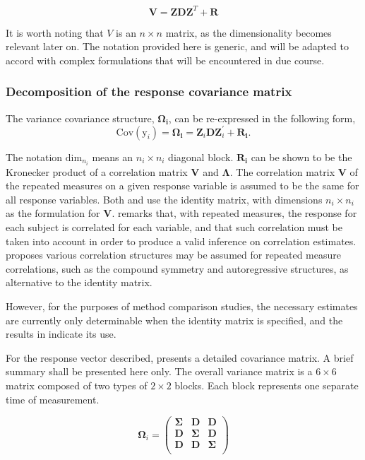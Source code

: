 \documentclass[12pt, a4paper]{report}
\theoremstyle{plain}
\theoremstyle{definition}
\theoremstyle{remark}
\begin{document}
	\begin{equation}
	\textbf{V}  = \textbf{ZDZ}^{T} + \textbf{R}
	\end{equation}
	
	It is worth noting that $V$ is an $n \times n$ matrix, as the dimensionality becomes relevant later on. The notation provided here is generic, and will be adapted to accord with complex formulations that will be encountered in due course.
	
	\subsubsection{Decomposition of the response covariance matrix}
	The variance covariance structure, $\boldsymbol{\Omega_{i}}$, can be re-expressed in the following form,
	\[
	\mbox{Cov}(\mbox{y}_{i}) = \boldsymbol{\Omega_{i}} = \boldsymbol{Z}_{i}\boldsymbol{D}\boldsymbol{Z}_{i}^\prime + \boldsymbol{R_{i}}.
	\]
	
	The notation $\mbox{dim}_{n_{i}}$ means an $n_{i} \times n_{i}$ diagonal block.
	$\boldsymbol{R_{i}}$ can be shown to be the Kronecker product of a correlation matrix $\boldsymbol{V}$ and $\boldsymbol{\Lambda}$. The correlation matrix $\boldsymbol{V}$ of the repeated measures on a given response variable is assumed to be the same for all response variables. Both \citet{hamlett} and \citet{lam} use the identity matrix, with dimensions $n_{i} \times n_{i}$ as the formulation for $\boldsymbol{V}$. \citet{ARoy2009} remarks that, with repeated measures, the response for each subject is correlated for each variable, and that such correlation must be taken into account in order to produce a valid inference on correlation estimates.  \citet{roy2006} proposes various correlation structures may be assumed for repeated measure correlations, such as the compound symmetry and autoregressive structures, as alternative to the identity matrix.
	
	
	However, for the purposes of method comparison studies, the necessary estimates are currently only determinable when the identity matrix is specified, and the results in \citet{ARoy2009} indicate its use.
	
	For the response vector described, \citet{hamlett} presents a detailed covariance matrix. A brief summary shall be presented here only. The overall variance matrix is a $6 \times 6$ matrix composed of two types of $2 \times 2$ blocks. Each block represents one separate time of measurement.
	
	\[
	\boldsymbol{\Omega}_{i} = \left(
	\begin{array}{ccc}
	\boldsymbol{\Sigma} & \boldsymbol{D} & \boldsymbol{D}\\
	\boldsymbol{D} & \boldsymbol{\Sigma} & \boldsymbol{D}\\
	\boldsymbol{D} & \boldsymbol{D} & \boldsymbol{\Sigma}\\
	\end{array}\right)
	\]
	
\end{document}
